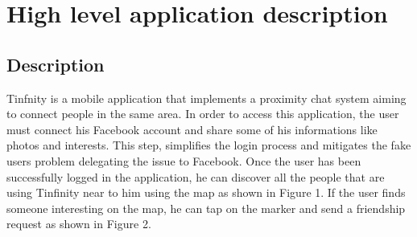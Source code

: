 
\section{High level application description}

\subsection{Description}
Tinfnity is a mobile application that implements a proximity chat system aiming to connect people in the same area. In order to access this application, the user must connect his Facebook account and share some of his informations like photos and interests. This step, simplifies the login process and mitigates the fake users problem delegating the issue to Facebook. Once the user has been successfully logged in the application, he can discover all the people that are using Tinfinity near to him using the map as shown in Figure 1. If the user finds someone interesting on the map, he can tap on the marker and send a friendship request as shown in Figure 2.

